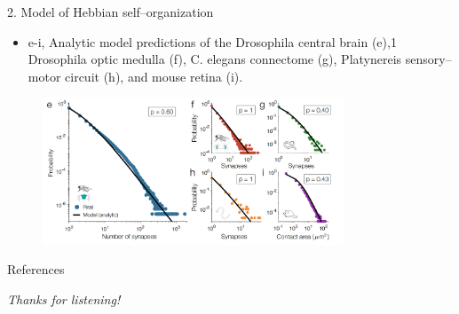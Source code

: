 \documentclass[
  notheorems,
  aspectratio=54,
]{beamer}
\begin{document}
\begin{frame}{2. Model of Hebbian self–organization}
  \begin{itemize}
    \item e-i, Analytic model predictions of the
Drosophila central brain (e),1 Drosophila optic medulla (f), C. elegans connectome (g), Platynereis
sensory–motor circuit (h), and mouse retina (i).
  \end{itemize}
  \begin{figure}
    \centering
    \includegraphics[width=0.8\textwidth]{./screenshot/7.png}
  \end{figure}
\end{frame}

\begin{frame}{References}
    \printbibliography
\end{frame}

\begin{frame}{}
  \centering \Huge
  \emph{Thanks for listening!}
\end{frame}
\end{document}

